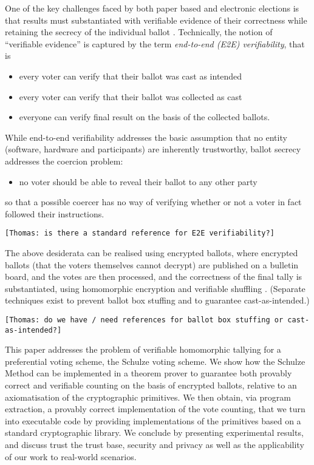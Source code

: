 \documentclass{llncs}
\begin{document}
One of the key challenges faced by both paper based and electronic
elections is that results must substantiated with
verifiable evidence of their correctness while retaining the secrecy
of the individual ballot \cite{Bernhard:2017:PES}.  Technically, the
notion of ``verifiable evidence'' is captured by the term 
\emph{end-to-end (E2E) verifiability}, that is
\begin{itemize}
  \item every voter can verify that their ballot was cast as
  intended
  \item every voter can verify that their ballot was collected as
  cast
  \item everyone can verify final result on the basis of the
  collected ballots.
\end{itemize}
While end-to-end verifiability addresses the basic assumption that
no entity (software, hardware and participants) are inherently
trustworthy, ballot secrecy addresses the coercion problem:
\begin{itemize}
  \item no voter should be able to reveal their ballot to any other
  party
\end{itemize}
so that a possible coercer has no way of verifying whether or not a
voter in fact followed their instructions. 

\begin{center}
\texttt{[Thomas: is there a standard reference for E2E
verifiability?]}
\end{center}

The above desiderata can be realised using encrypted ballots, where
encrypted ballots (that the voters themselves cannot decrypt) are
published on a bulletin board, and the votes are then processed, and
the correctness of the final tally is substantiated, using
homomorphic encryption \cite{Hirt:2000:ERF} and verifiable shuffling
\cite{Bayer:2012:EZK}. (Separate techniques exist to prevent ballot
box stuffing and to guarantee cast-as-intended.)

\begin{center}
\texttt{[Thomas: do we have / need references for ballot box
stuffing or cast-as-intended?]}
\end{center}

This paper addresses the problem of verifiable homomorphic tallying
for a preferential voting scheme, the Schulze voting scheme. We show
how the Schulze Method can be implemented in a theorem prover to
guarantee both provably correct and verifiable counting on the basis
of encrypted ballots, relative to an axiomatisation of the
cryptographic primitives. We then obtain, via program extraction, a
provably correct implementation of the vote counting, that we turn
into executable code by providing implementations of the primitives
based on a standard cryptographic library. We conclude by presenting
experimental results, and discuss trust the trust base, security and
privacy as well as the applicability of our work to real-world
scenarios. 
\end{document}
